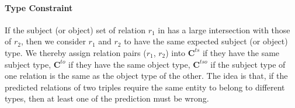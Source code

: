 \paragraph{Type Constraint}
If the subject (or object) set of relation $r_1$ in \KB has a large intersection with those of $r_2$, then we consider $r_1$ and $r_2$ to have the same expected subject (or object) type.
We thereby assign relation pairs ($r_1$, $r_2$) into $\bm{C}^{ts}$ if they have the same subject type, $\bm{C}^{to}$ if they have the same object type, $\bm{C}^{tso}$  if the subject type of one relation is the same as the object type of the other.
The idea is that, if the predicted relations of two triples require the same entity to belong to different types, then at least one of the prediction must be wrong.

